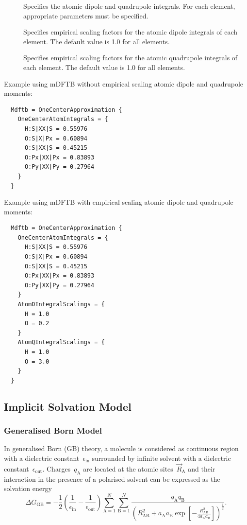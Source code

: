 \begin{description}
\item[] Specifies the atomic dipole and quadrupole integrals.
  For each element, appropriate parameters must be specified.

\item[] Specifies empirical scaling factors for the atomic dipole
  integrals of each element. The default value is 1.0 for all elements.

\item[] Specifies empirical scaling factors for the atomic quadrupole
  integrals of each element. The default value is 1.0 for all elements.
\end{description}

Example using mDFTB without empirical scaling atomic dipole and quadrupole moments:
\begin{verbatim}
  Mdftb = OneCenterApproximation {
    OneCenterAtomIntegrals = {
      H:S|XX|S = 0.55976
      O:S|X|Px = 0.60894
      O:S|XX|S = 0.45215
      O:Px|XX|Px = 0.83893
      O:Py|XX|Py = 0.27964
    }
  }
\end{verbatim}

Example using mDFTB with empirical scaling atomic dipole and quadrupole moments:
\begin{verbatim}
  Mdftb = OneCenterApproximation {
    OneCenterAtomIntegrals = {
      H:S|XX|S = 0.55976
      O:S|X|Px = 0.60894
      O:S|XX|S = 0.45215
      O:Px|XX|Px = 0.83893
      O:Py|XX|Py = 0.27964
    }
    AtomDIntegralScalings = {
      H = 1.0
      O = 0.2
    }
    AtomQIntegralScalings = {
      H = 1.0
      O = 3.0
    }
  }
\end{verbatim}

\subsection{Implicit Solvation Model}
\label{sec:dftbp.Solvation}

\subsubsection{Generalised Born Model}
\label{sec:dftbp.GeneralisedBorn}

In generalised Born (GB) theory,\cite{onufriev2019} a molecule is considered as
continuous region with a dielectric constant~$\epsilon_\text{in}$ surrounded by
infinite solvent with a dielectric constant~$\epsilon_\text{out}$.
Charges~$q_\text{A}$ are located at the atomic sites~$\vec R_\text{A}$
and their interaction in the presence of a polarised solvent can be
expressed as the solvation energy
%
\begin{equation}
  \Delta G_\text{GB} =
  -\frac12 \left(\frac1{\epsilon_\text{in}}-\frac1{\epsilon_\text{out}}\right)
  \sum_{\text{A}=1}^N\sum_{\text{B}=1}^N\frac{q_\text{A}q_\text{B}}
  {\left(R^2_\text{AB} + a_\text{A}a_\text{B}\exp\left[-\frac{R^2_\text{AB}}
  {4a_\text{A}a_\text{B}}\right]\right)^{\frac12}}.
\end{equation}

